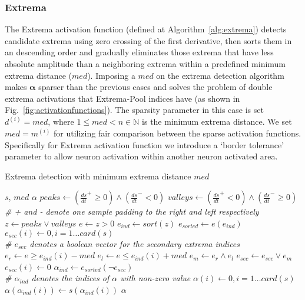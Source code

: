 \documentclass[journal]{IEEEtran}
\begin{document}
\subsubsection{Extrema}
\label{sec:extrema}
The Extrema activation function (defined at Algorithm~\ref{alg:extrema}) detects candidate extrema using zero crossing of the first derivative, then sorts them in an descending order and gradually eliminates those extrema that have less absolute amplitude than a neighboring extrema within a predefined minimum extrema distance ($med$).
Imposing a $med$ on the extrema detection algorithm makes $\bm{\alpha}$ sparser than the previous cases and solves the problem of double extrema activations that Extrema-Pool indices have (as shown in Fig.~\ref{fig:activationfunctions}).
The sparsity parameter in this case is set $d^{(i)} = med$, where $1 \le med < n \in \mathbb{N}$ is the minimum extrema distance.
We set $med = m^{(i)}$ for utilizing fair comparison between the sparse activation functions.
Specifically for Extrema activation function we introduce a `border tolerance' parameter to allow neuron activation within another neuron activated area.

\begin{algorithm}[H]
	\caption{Extrema detection with minimum extrema distance $med$}
	\label{alg:extrema}
	\begin{algorithmic}[1]
		\renewcommand{\algorithmicrequire}{\textbf{Input:}}
		\renewcommand{\algorithmicensure}{\textbf{Output:}}
		\REQUIRE $s$, $med$
		\ENSURE $\alpha$
		\STATE $peaks \leftarrow \left(\frac{d s}{d t}^+ \geq 0\right) \land \left(\frac{d s}{d t}^- < 0\right)$
		\STATE $valleys \leftarrow \left(\frac{d s}{d t}^+ < 0\right) \land \left(\frac{d s}{d t}^- \geq 0\right)$
		\\\textit{\scriptsize \# + and - denote one sample padding to the right and left respectively}
		\STATE $z \leftarrow peaks \lor valleys$
		\STATE $e \leftarrow z > 0$
		\STATE $e_{ind} \leftarrow sort(z)$
		\STATE $e_{sorted} \leftarrow e(e_{ind})$
		\STATE $e_{sec}(i) \leftarrow 0, i=1\ldots card(s)$
		\\\textit{\scriptsize \# $e_{sec}$ denotes a boolean vector for the secondary extrema indices}
		\STATE $e_r \leftarrow e \geq e_{ind}(i) - med$
		\STATE $e_l \leftarrow e \leq e_{ind}(i) + med$
		\STATE $e_m \leftarrow e_r \land e_l$
		\STATE $e_{sec} \leftarrow e_{sec} \lor e_m$
		\STATE $e_{sec}(i) \leftarrow 0$
		\ENDIF
		\ENDFOR
		\STATE $\alpha_{ind} \leftarrow e_{sorted}(\lnot e_{sec})$
		\\\textit{\scriptsize \# $\alpha_{ind}$ denotes the indices of $\alpha$ with non-zero value}
		\STATE $\alpha(i) \leftarrow 0, i=1\ldots card(s)$
		\STATE $\alpha(\alpha_{ind}(i)) \leftarrow s(\alpha_{ind}(i))$
		\ENDFOR
		\RETURN $\alpha$
	\end{algorithmic}
\end{algorithm}
\end{document}
